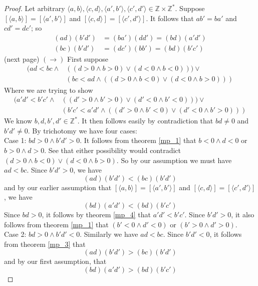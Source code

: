 \documentclass{report}
\begin{document}
\begin{proof}
Let arbitrary $\langle a,b\rangle,\langle c,d\rangle,\langle a',b'\rangle,\langle c',d'\rangle\in\mathbb Z\times\mathbb Z^*$. Suppose 
$[\langle a,b\rangle]=[\langle a',b'\rangle]$ and $[\langle c,d\rangle]=[\langle c',d'\rangle]$. It follows that $ab'=ba'$ and $cd'=dc'$; so
\begin{align*}
(ad)(b'd')&=(ba')(dd')=(bd)(a'd')\\
(bc)(b'd')&=(dc')(bb')=(bd)(b'c')
\end{align*}
(next page)\newpage
$(\rightarrow)$ First suppose 
\begin{align*}
(ad<bc\land&((d>0\land b>0)\lor(d<0\land b<0)))\lor\\
&(bc<ad\land((d>0\land b<0)\lor(d<0\land b>0)))
\end{align*}
Where we are trying to show
\begin{align*}
(a'd'<b'c'\land&((d'>0\land b'>0)\lor(d'<0\land b'<0)))\lor\\
&(b'c'<a'd'\land((d'>0\land b'<0)\lor(d'<0\land b'>0)))
\end{align*}
We know $b,d,b',d'\in\mathbb Z^*$. It then follows easily by contradiction that $bd\neq0$ and $b'd'\neq0$. By trichotomy we have four cases:\\
\indent Case 1: $bd>0\land b'd'>0$. It follows from theorem \ref{mp_1} that $b<0\land d<0$ or $b>0\land d>0$. See that either possibility would contradict $(d>0\land b<0)\lor(d<0\land b>0)$.
So by our assumption we must have $ad<bc$. Since $b'd'>0$, we have
\begin{equation*}
(ad)(b'd')<(bc)(b'd')
\end{equation*}
and by our earlier assumption that 
$[\langle a,b\rangle]=[\langle a',b'\rangle]$ and $[\langle c,d\rangle]=[\langle c',d'\rangle]$, we have
\begin{equation*}
(bd)(a'd')<(bd)(b'c')
\end{equation*}
Since $bd>0$, it follows by theorem \ref{mp_4} that $a'd'<b'c'$. Since $b'd'>0$, it also follows from theorem \ref{mp_1} that $(b'<0\land d'<0)$ or $(b'>0\land d'>0)$.\\
\indent Case 2: $bd>0\land b'd'<0$. Similarly we have $ad<bc$. Since $b'd'<0$, it follows from theorem \ref{mp_3} that 
\begin{equation*}
(ad)(b'd')>(bc)(b'd')
\end{equation*}
and by our first assumption, that
\begin{equation*}
(bd)(a'd')>(bd)(b'c')
\end{equation*}

\end{proof}
\end{document}

